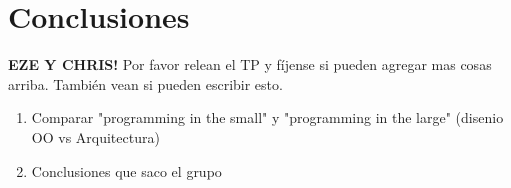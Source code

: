 \documentclass{article}
\theoremstyle{definition}
\theoremstyle{remark}
\begin{document}
\pagebreak

\section{Conclusiones}

\textbf{EZE Y CHRIS!} Por favor relean el TP y fíjense si pueden agregar mas cosas arriba. También vean si pueden escribir esto.

\begin{enumerate}
	\item Comparar "programming in the small" y "programming in the large" (disenio OO vs Arquitectura)
	\item Conclusiones que saco el grupo
\end{enumerate}
\end{document}
